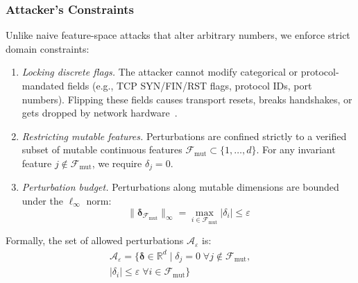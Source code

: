 \documentclass[iicol,pdflatex,sn-mathphys-num]{sn-jnl}
\begin{document}
\subsubsection{Attacker's Constraints}
Unlike naive feature-space attacks that alter arbitrary numbers, we enforce strict domain constraints:
\begin{enumerate}
    \item \textit{Locking discrete flags.} The attacker cannot modify categorical or protocol-mandated fields (e.g., TCP SYN/FIN/RST flags, protocol IDs, port numbers). Flipping these fields causes transport resets, breaks handshakes, or gets dropped by network hardware~\cite{apruzzese2022modeling}.
    \item \textit{Restricting mutable features.} Perturbations are confined strictly to a verified subset of mutable continuous features $\mathcal{F}_{\text{mut}} \subset \{1, \dots, d\}$. For any invariant feature $j \notin \mathcal{F}_{\text{mut}}$, we require $\delta_j = 0$.
    \item \textit{Perturbation budget.} Perturbations along mutable dimensions are bounded under the $\ell_\infty$ norm:
    \begin{equation}
        \|\boldsymbol{\delta}_{\mathcal{F}_{\text{mut}}}\|_\infty = \max_{i \in \mathcal{F}_{\text{mut}}} |\delta_i| \leq \varepsilon
    \end{equation}
\end{enumerate}

Formally, the set of allowed perturbations $\mathcal{A}_\varepsilon$ is:
\begin{multline}
    \mathcal{A}_\varepsilon = \big\{ \boldsymbol{\delta} \in \mathbb{R}^d \mid \delta_j = 0 \;\forall j \notin \mathcal{F}_{\text{mut}},\\
    |\delta_i| \leq \varepsilon \;\forall i \in \mathcal{F}_{\text{mut}} \big\}
\end{multline}
\end{document}
